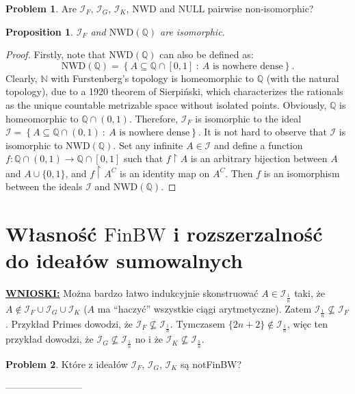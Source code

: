 \documentclass{amsart}
\newtheorem{prop}{Proposition}
\theoremstyle{definition}
\newtheorem{problem}{Problem}
\theoremstyle{definition}
\newcommand{\N}{{\mathbb N}}
\newcommand{\Q}{{\mathbb Q}}
\newcommand{\I}{\mathcal I}
\newcommand{\finbw}{\text{FinBW}}
\begin{document}
\begin{problem}
Are $\I_F$, $\I_G$, $\I_K$, $\textrm{NWD}$ and $\textrm{NULL}$ pairwise non-isomorphic?
\end{problem}


\begin{prop}
$\I_F$ and $\textrm{NWD}(\Q)$ are isomorphic.
\end{prop}
\begin{proof}
Firstly, note that $\textrm{NWD}(\Q)$ can also be defined as:
$$\textrm{NWD}(\Q)=\left\{A\subseteq\mathbb{Q}\cap [0,1]\ :\ A \textrm{ is nowhere dense}\right\}.$$
Clearly, $\N$ with Furstenberg's topology is homeomorphic to $\Q$ (with the natural topology), due to a 1920 theorem of Sierpi\'nski, which characterizes the rationals as the unique countable metrizable space without isolated points. Obviously, $\Q$ is homeomorphic to $\Q\cap (0,1)$. Therefore, $\I_F$ is isomorphic to the ideal $\I = \left\{A\subseteq\Q\cap (0,1)\ :\ A \textrm{ is nowhere dense}\right\}$. It is not hard to observe that $\I$ is isomorphic to $\textrm{NWD}(\Q)$. Set any infinite $A\in\I$ and define a function $f : \Q\cap (0,1) \to \Q\cap [0,1]$ such that $f\upharpoonright A$ is an arbitrary bijection between $A$ and $A\cup\{0,1\}$, and $f\upharpoonright A^C$ is an identity map on $A^C$.
Then $f$ is an isomorphism between the ideals $\I$ and $\textrm{NWD}(\Q)$.
\end{proof}



    \color{purple}
		
\section{Własność $\finbw$ i rozszerzalność do ideałów sumowalnych}

\textbf{\underline{WNIOSKI:}} 
Można bardzo łatwo indukcyjnie skonstruować $A\in \I_{\frac{1}{n}}$ taki, że $A\notin \I_F\cup\I_G\cup\I_K$ ($A$ ma "`haczyć"' wszystkie ciągi arytmetyczne). Zatem $\I_{\frac{1}{n}} \nsubseteq \I_F$. Przykład Primes dowodzi, że $\I_F \nsubseteq \I_{\frac{1}{n}}$. Tymczasem $\{2n+2\}\notin\I_{\frac{1}{n}}$, więc ten przykład dowodzi, że $\I_G \nsubseteq \I_{\frac{1}{n}}$ no i że $\I_K \nsubseteq \I_{\frac{1}{n}}$.

\begin{problem}
Które z ideałów $\I_F$, $\I_G$, $\I_K$ są notFinBW?
\end{problem}

------------------------
\color{teal}
\end{document}
